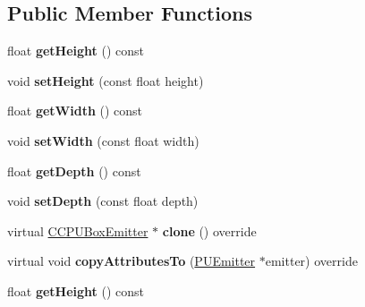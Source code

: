 \subsection*{Public Member Functions}
\begin{DoxyCompactItemize}
\item 
\mbox{\label{classCCPUBoxEmitter_a489e2a2939336023865fa97a6373f33a}} 
float {\bfseries get\+Height} () const
\item 
\mbox{\label{classCCPUBoxEmitter_a75acdddda5ec21feec404df3c106508d}} 
void {\bfseries set\+Height} (const float height)
\item 
\mbox{\label{classCCPUBoxEmitter_a97b157fd33177d9590277497f3ad1bdb}} 
float {\bfseries get\+Width} () const
\item 
\mbox{\label{classCCPUBoxEmitter_a3b1cd528e3ee2cc2a203cf2a03d1ad5e}} 
void {\bfseries set\+Width} (const float width)
\item 
\mbox{\label{classCCPUBoxEmitter_a64129aea8e4ffc32aba62a54f64d68ac}} 
float {\bfseries get\+Depth} () const
\item 
\mbox{\label{classCCPUBoxEmitter_ac288b3c689bee4f7b181f457f1c7ff44}} 
void {\bfseries set\+Depth} (const float depth)
\item 
\mbox{\label{classCCPUBoxEmitter_a1c69982d8ae172ce7d7d0ce77ade2fe0}} 
virtual \hyperlink{classCCPUBoxEmitter}{C\+C\+P\+U\+Box\+Emitter} $\ast$ {\bfseries clone} () override
\item 
\mbox{\label{classCCPUBoxEmitter_ac1d237a4a8633bd9e994f734041c1313}} 
virtual void {\bfseries copy\+Attributes\+To} (\hyperlink{classPUEmitter}{P\+U\+Emitter} $\ast$emitter) override
\item 
\mbox{\label{classCCPUBoxEmitter_a489e2a2939336023865fa97a6373f33a}} 
float {\bfseries get\+Height} () const
\item 
\mbox{\label{classCCPUBoxEmitter_a75acdddda5ec21feec404df3c106508d}} 

\end{DoxyCompactItemize}
